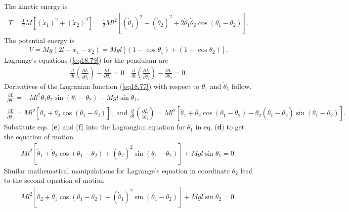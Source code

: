 \documentclass{AeroStructure-ERJohnson}
\begin{document}
\begin{example}
\noindent
The kinetic energy is
\begin{align}\label{ex18.1b}
T=\frac{1}{2} M\left[\left(\dot{x}_{1}\right)^{2}+\left(\dot{x}_{2}\right)^{2}\right]=\frac{1}{2} M l^{2}\left[\left(\dot{\theta}_{1}\right)^{2}+\left(\dot{\theta}_{2}\right)^{2}+2 \dot{\theta}_{1} \dot{\theta}_{2} \cos \left(\theta_{1}-\theta_{2}\right)\right].
\end{align}
The potential energy is
\begin{align}\label{ex18.1c}
V=M g\left(2 l-x_{1}-x_{2}\right)=M g l\left[\left(1-\cos \theta_{1}\right)+\left(1-\cos \theta_{2}\right)\right].
\end{align}
Lagrange's equations (\ref{eq18.79}) for the pendulum are
\begin{align}\label{ex18.1d}
\frac{d}{d t}\left(\frac{\partial L}{\partial \dot{\theta}_{1}}\right)-\frac{\partial L}{\partial \theta_{1}}=0 \quad \frac{d}{d t}\left(\frac{\partial L}{\partial \dot{\theta}_{2}}\right)-\frac{\partial L}{\partial \theta_{2}}=0.
\end{align}
Derivatives of the Lagranian function (\ref{eq18.77}) with respect to $\theta_{1}$ and $\dot{\theta}_{1}$ follow.
\begin{gather}\label{ex18.1e}
\frac{\partial L}{\partial \theta_{1}}=-M l^{2} \dot{\theta}_{1} \dot{\theta}_{2} \sin \left(\theta_{1}-\theta_{2}\right)-M g l \sin \theta_{1}, \\
\frac{\partial L}{\partial \dot{\theta}_{1}}=M l^{2}\left[\dot{\theta}_{1}+\dot{\theta}_{2} \cos \left(\theta_{1}-\theta_{2}\right)\right],\text{ and }\frac{d}{d t}\left(\frac{\partial L}{\partial \dot{\theta}_{1}}\right)=M l^{2}\left[\ddot{\theta}_{1}+\ddot{\theta}_{2} \cos \left(\theta_{1}-\theta_{2}\right)-\dot{\theta}_{2}\left(\dot{\theta}_{1}-\dot{\theta}_{2}\right) \sin \left(\theta_{1}-\theta_{2}\right)\right]. \label{ex18.1f}
\end{gather}
Substitute eqs. (\textbf{e}) and (\textbf{f}) into the Lagrangian equation for $\theta_{1}$ in eq. (\textbf{d}) to get the equation of motion
\begin{align}\label{ex18.1g}
M l^{2}\left[\ddot{\theta}_{1}+\ddot{\theta}_{2} \cos \left(\theta_{1}-\theta_{2}\right)+\left(\dot{\theta}_{2}\right)^{2} \sin \left(\theta_{1}-\theta_{2}\right)\right]+M g l \sin \theta_{1}=0.
\end{align}
Similar mathematical manipulations for Lagrange's equation in coordinate $\theta_{2}$ lead to the second equation of motion
\begin{align}\label{ex18.1h}
M l^{2}\left[\ddot{\theta}_{2}+\ddot{\theta}_{1} \cos \left(\theta_{1}-\theta_{2}\right)-\left(\dot{\theta}_{1}\right)^{2} \sin \left(\theta_{1}-\theta_{2}\right)\right]+M g l \sin \theta_{2}=0.\\[-2.6pc] \nonumber
\end{align}
\end{example}
\end{document}
